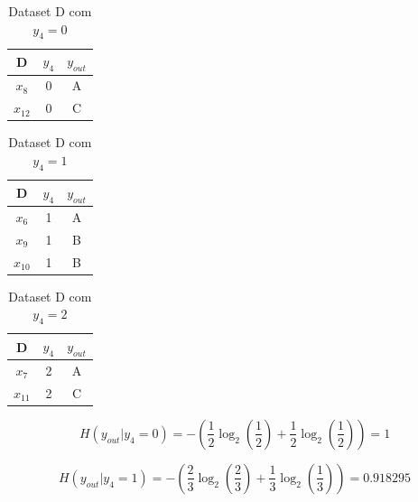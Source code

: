 \documentclass{article}
\begin{document}
\begin{center}
\begin{minipage}[b]{0.3\linewidth}
  \centering
  \begin{table}[H]
    \centering
    \begin{tabular}{|c|c|c|}
      \hline  
      D     & $y_4$ & $y_{out}$ \\ \hline
      $x_8$ & 0     & A         \\ \hline
      $x_{12}$ & 0     & C         \\ \hline
    \end{tabular}
    \caption{Dataset D com $y_4 = 0$}
    \label{tab:datasetDy4=0}
  \end{table}
\end{minipage}
\begin{minipage}[b]{0.3\linewidth}
  \centering
  \begin{table}[H]
    \centering
    \begin{tabular}{|c|c|c|}
      \hline
      D     & $y_4$ & $y_{out}$ \\ \hline
      $x_6$ & 1     & A         \\ \hline
      $x_9$ & 1     & B         \\ \hline
      $x_{10}$ & 1     & B         \\ \hline
      \end{tabular}
    \caption{Dataset D com $y_4 = 1$}
    \label{tab:datasetDy4=1}
  \end{table}
\end{minipage}
\begin{minipage}[b]{0.3\linewidth}
  \centering
  \begin{table}[H]
    \centering
    \begin{tabular}{|c|c|c|}
      \hline
      D     & $y_4$ & $y_{out}$ \\ \hline
      $x_7$ & 2     & A         \\ \hline
      $x_{11}$ & 2     & C         \\ \hline
    \end{tabular}
    \caption{Dataset D com $y_4 = 2$}
    \label{tab:datasetDy4=2}
  \end{table}
\end{minipage}
\end{center}

\[ H(y_{out}|y_4 = 0) = - \left( \frac{1}{2} \log_2 \left( \frac{1}{2} \right) + \frac{1}{2} \log_2 \left( \frac{1}{2} \right) \right) = 1 \]

\[ H(y_{out}|y_4 = 1) = - \left( \frac{2}{3} \log_2 \left( \frac{2}{3} \right) + \frac{1}{3} \log_2 \left( \frac{1}{3} \right) \right) = 0.918295 \]
\end{document}
